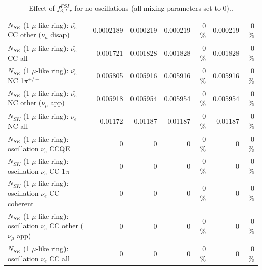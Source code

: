 \begin{table}
\begin{tabular}{| l | r | r | r  r | r  r |}
          $N_{SK}$ (1 $\mu$-like ring): $\bar{\nu_e}$ CC other ($\nu_\mu$ disap) &       0.0002189 &        0.000219 &        0.000219 &        0 \%  &        0.000219 &        0 \%  \\ 
                            $N_{SK}$ (1 $\mu$-like ring): $\bar{\nu_{e}}$ CC all &        0.001721 &        0.001828 &        0.001828 &        0 \%  &        0.001828 &        0 \%  \\ 
\hline
                     $N_{SK}$ (1 $\mu$-like ring): $\bar{\nu_e}$ NC 1$\pi^{+/-}$ &        0.005805 &        0.005916 &        0.005916 &        0 \%  &        0.005916 &        0 \%  \\ 
            $N_{SK}$ (1 $\mu$-like ring): $\bar{\nu_e}$ NC other ($\nu_\mu$ app) &        0.005918 &        0.005954 &        0.005954 &        0 \%  &        0.005954 &        0 \%  \\ 
                            $N_{SK}$ (1 $\mu$-like ring): $\bar{\nu_{e}}$ NC all &         0.01172 &         0.01187 &         0.01187 &        0 \%  &         0.01187 &        0 \%  \\ 
\hline
\hline
\hline
                          $N_{SK}$ (1 $\mu$-like ring): oscillation $\nu_e$ CCQE &               0 &               0 &               0 &        0 \%  &               0 &        0 \%  \\ 
                     $N_{SK}$ (1 $\mu$-like ring): oscillation $\nu_e$ CC 1$\pi$ &               0 &               0 &               0 &        0 \%  &               0 &        0 \%  \\ 
                   $N_{SK}$ (1 $\mu$-like ring): oscillation $\nu_e$ CC coherent &               0 &               0 &               0 &        0 \%  &               0 &        0 \%  \\ 
      $N_{SK}$ (1 $\mu$-like ring): oscillation $\nu_e$ CC other ($\nu_\mu$ app) &               0 &               0 &               0 &        0 \%  &               0 &        0 \%  \\ 
                       $N_{SK}$ (1 $\mu$-like ring): oscillation $\nu_e$  CC all &               0 &               0 &               0 &        0 \%  &               0 &        0 \%  \\ 
\hline
\hline
\end{tabular}
\caption{ Effect of $f_{3; t, r}^{FSI}$ for no oscillations (all mixing parameters set to 0).. }
\label{tab:num_fsi_003_1RmuT_3f_osc_t13:0_spectralreco_spectraltrue}
\end{table}
\clearpage
